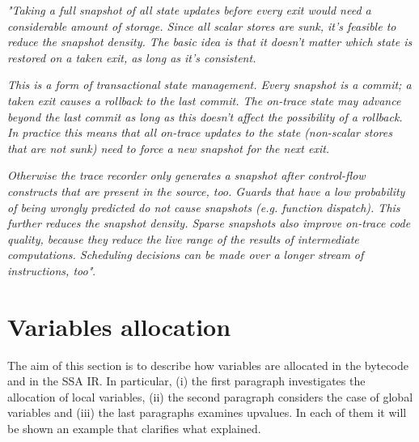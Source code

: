 \textit{"Taking a full snapshot of all state updates before every exit would need a considerable amount of storage. Since all scalar stores are sunk, it's feasible to reduce the snapshot density. The basic idea is that it doesn't matter which state is restored on a taken exit, as long as it's consistent.}

\textit{This is a form of transactional state management. Every snapshot is a commit; a taken exit causes a rollback to the last commit. The on-trace state may advance beyond the last commit as long as this doesn't affect the possibility of a rollback. In practice this means that all on-trace updates to the state (non-scalar stores that are not sunk) need to force a new snapshot for the next exit.}

\textit{Otherwise the trace recorder only generates a snapshot after control-flow constructs that are present in the source, too. Guards that have a low probability of being wrongly predicted do not cause snapshots (e.g. function dispatch). This further reduces the snapshot density. Sparse snapshots also improve on-trace code quality, because they reduce the live range of the results of intermediate computations. Scheduling decisions can be made over a longer stream of instructions, too"}.

\section{Variables allocation}

The aim of this section is to describe how variables are allocated in the bytecode and in the SSA IR. In particular, (i) the first paragraph investigates the allocation of local variables, (ii) the second paragraph considers the case of global variables and (iii) the last paragraphs examines upvalues. In each of them it will be shown an example that clarifies what explained.

